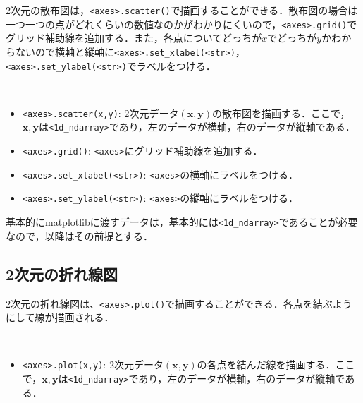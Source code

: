 2次元の散布図は，\texttt{<axes>.scatter()}で描画することができる．散布図の場合は一つ一つの点がどれくらいの数値なのかがわかりにくいので，\texttt{<axes>.grid()}でグリッド補助線を追加する．また，各点についてどっちが$x$でどっちが$y$かわからないので横軸と縦軸に\texttt{<axes>.set\_xlabel(<str>)}，\texttt{<axes>.set\_ylabel(<str>)}でラベルをつける．
\begin{gram}　
\begin{itemize}
\item \texttt{<axes>.scatter(x,y)}: 2次元データ$(\bm{x},\bm{y})$の散布図を描画する．ここで，$\bm{x},\bm{y}$は\texttt{<1d\_ndarray>}であり，左のデータが横軸，右のデータが縦軸である．
\item \texttt{<axes>.grid()}: \texttt{<axes>}にグリッド補助線を追加する．
\item \texttt{<axes>.set\_xlabel(<str>)}: \texttt{<axes>}の横軸にラベルをつける．
\item \texttt{<axes>.set\_ylabel(<str>)}: \texttt{<axes>}の縦軸にラベルをつける．
\end{itemize}
\end{gram}

\begin{rem}
基本的にmatplotlibに渡すデータは，基本的には\texttt{<1d\_ndarray>}であることが必要なので，以降はその前提とする．
\end{rem}

\begin{cod}[\texttt{fig2.py}]　
}]{code/fig2.py}
\vspace{-19pt}
\begin{figure}[H]
\begin{center}
\framed
\texttt{[image: code/fig2.eps]}
\vspace{-10pt}
\caption{\texttt{fig2.eps}}
\endframed
\end{center}
\end{figure}
\end{cod}
\vspace{-20pt}

\subsection{2次元の折れ線図}

2次元の折れ線図は、\texttt{<axes>.plot()}で描画することができる．各点を結ぶようにして線が描画される．
\begin{gram}　
\begin{itemize}
\item \texttt{<axes>.plot(x,y)}: 2次元データ$(\bm{x},\bm{y})$の各点を結んだ線を描画する．ここで，$\bm{x},\bm{y}$は\texttt{<1d\_ndarray>}であり，左のデータが横軸，右のデータが縦軸である．
\end{itemize}
\end{gram}

